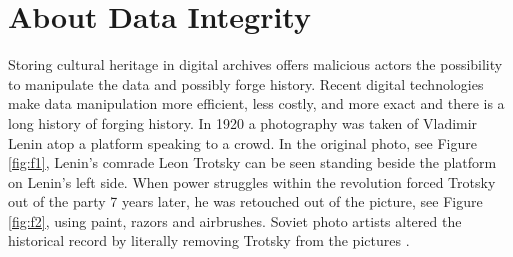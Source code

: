 \section{About Data Integrity}
Storing cultural heritage in digital archives offers malicious actors the possibility to manipulate the data and possibly forge history. Recent digital technologies make data manipulation more efficient, less costly, and more exact and there is a long history of forging history. 
In 1920 a photography was taken of Vladimir Lenin atop a platform speaking to a crowd. In the original photo, see Figure \ref{fig:f1}, Lenin's comrade Leon Trotsky can be seen standing beside the platform on Lenin's left side. When power struggles within the revolution forced Trotsky out of the party 7 years later, he was retouched out of the picture, see Figure \ref{fig:f2}, using paint, razors and airbrushes. Soviet photo artists altered the historical record by literally removing Trotsky from the pictures \cite[3]{hofer2005digital}.

